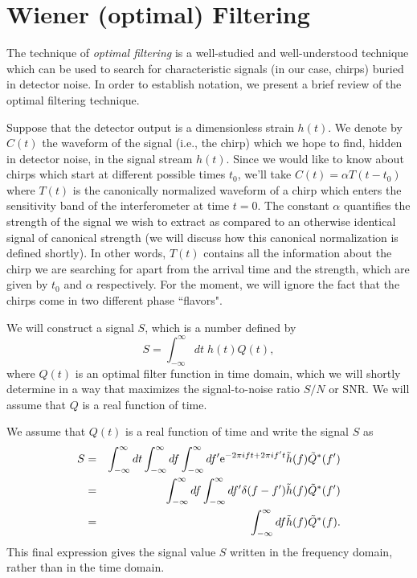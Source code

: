 \section{Wiener (optimal) Filtering}

The technique of {\it optimal filtering} is a well-studied and
well-understood technique which can be used to search for
characteristic signals (in our case, chirps) buried in detector noise.
In order to establish notation, we present a brief review of the optimal 
filtering technique.

Suppose that the detector output is a dimensionless strain $h(t)$.
We denote by ${C}(t)$ the waveform of the signal (i.e.,
the chirp) which we hope to find, hidden in detector noise, in the
signal stream $h(t)$.  Since we would like to know about chirps which
start at different possible times $t_0$, we'll take ${C}(t) =
\alpha T(t-t_0)$ where $T(t)$ is the canonically normalized waveform 
of a chirp which enters the sensitivity band of the interferometer at 
time $t=0$. The constant $\alpha$ quantifies the strength of the signal
we wish to extract as compared to an otherwise identical signal of 
canonical strength (we will discuss how this canonical normalization
is defined shortly). In other words, $T(t)$ contains all the 
information about the chirp we are searching for apart from the 
arrival time and the strength, which are given by $t_0$ and $\alpha$ 
respectively. For the moment, we will ignore the fact that 
the chirps come in two different phase ``flavors".

We will construct a signal $S$, which is a number defined by
\begin{equation}
S = \int_{-\infty}^\infty dt \;h(t) Q(t),
\end{equation}
where $Q(t)$ is an optimal filter function in time domain, which we
will shortly determine in a way that maximizes the signal-to-noise
ratio $S/N$ or SNR.  We will assume that $Q$ is a real function of
time.

We assume that $Q(t)$ is a real function of time and write the 
signal $S$ as
\begin{eqnarray}
\nonumber
S &=& \int_{-\infty}^\infty dt  \int_{-\infty}^\infty df  \int_{-\infty}^\infty df'
{\rm e}^{-2 \pi i f t+2 \pi i f' t} \tilde h(f) \tilde Q^* (f')\\
\nonumber
&=& 
\int_{-\infty}^\infty df  \int_{-\infty}^\infty df'
\delta(f-f') \tilde h(f) \tilde Q^* (f')\\
&=& 
\int_{-\infty}^\infty df \tilde h(f) \tilde Q^* (f).
\end{eqnarray}
This final expression gives the signal value $S$ written in the
frequency domain, rather than in the time domain.

